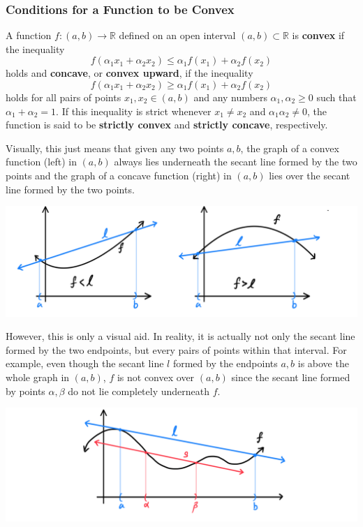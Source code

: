 \documentclass{article}
\begin{document}
    \subsubsection{Conditions for a Function to be Convex}
    \begin{definition}
      A function $f: (a, b) \longrightarrow \mathbb{R}$ defined on an open interval $(a, b) \subset \mathbb{R}$ is \textbf{convex} if the inequality
      \[f( \alpha_1 x_1 + \alpha_2 x_2) \leq \alpha_1 f(x_1) + \alpha_2 f(x_2)\]
      holds and \textbf{concave}, or \textbf{convex upward}, if the inequality 
      \[f( \alpha_1 x_1 + \alpha_2 x_2) \geq \alpha_1 f(x_1) + \alpha_2 f(x_2)\]
      holds for all pairs of points $x_1, x_2 \in (a, b)$ and any numbers $\alpha_1, \alpha_2 \geq 0$ such that $\alpha_1 + \alpha_2 = 1$. If this inequality is strict whenever $x_1 \neq x_2$ and $\alpha_1 \alpha_2 \neq 0$, the function is said to be \textbf{strictly convex} and \textbf{strictly concave}, respectively. 

      Visually, this just means that given any two points $a, b$, the graph of a convex function (left) in $(a, b)$ always lies underneath the secant line formed by the two points and the graph of a concave function (right) in $(a, b)$ lies over the secant line formed by the two points. 
      \begin{center}
          \includegraphics[scale=0.25]{img/Convex_Concave_Functions_Secant.PNG}
      \end{center}
      However, this is only a visual aid. In reality, it is actually not only the secant line formed by the two endpoints, but every pairs of points within that interval. For example, even though the secant line $l$ formed by the endpoints $a, b$ is above the whole graph in $(a, b)$, $f$ is not convex over $(a, b)$ since the secant line formed by points $\alpha, \beta$ do not lie completely underneath $f$. 
      \begin{center}
          \includegraphics[scale=0.25]{img/Multiple_Secant_Lines_Convex_Clarification.PNG}
      \end{center}
    \end{definition}
\end{document}
